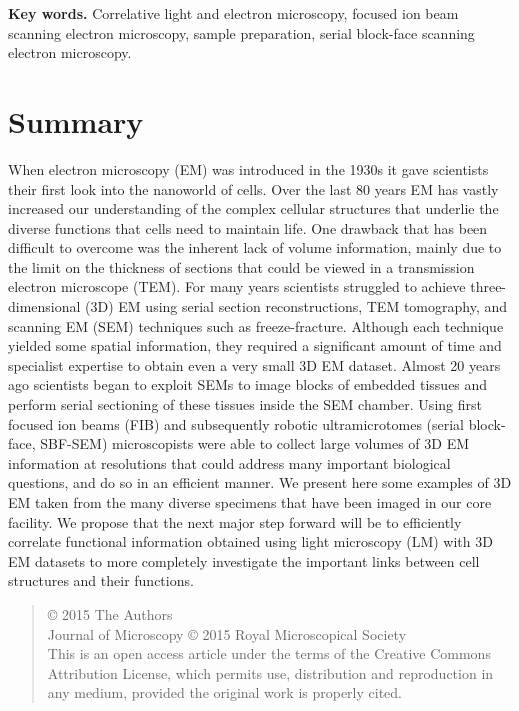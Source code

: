 \documentclass{article}
\begin{document}
\noindent\textbf{Key words.} Correlative light and electron microscopy, focused ion beam scanning electron microscopy, sample preparation, serial block-face scanning electron microscopy.

\section*{Summary}

When electron microscopy (EM) was introduced in the 1930s it gave scientists their first look into the nanoworld of cells. Over the last 80 years EM has vastly increased our understanding of the complex cellular structures that underlie the diverse functions that cells need to maintain life. One drawback that has been difficult to overcome was the inherent lack of volume information, mainly due to the limit on the thickness of sections that could be viewed in a transmission electron microscope (TEM). For many years scientists struggled to achieve three-dimensional (3D) EM using serial section reconstructions, TEM tomography, and scanning EM (SEM) techniques such as freeze-fracture. Although each technique yielded some spatial information, they required a significant amount of time and specialist expertise to obtain even a very small 3D EM dataset. Almost 20 years ago scientists began to exploit SEMs to image blocks of embedded tissues and perform serial sectioning of these tissues inside the SEM chamber. Using first focused ion beams (FIB) and subsequently robotic ultramicrotomes (serial block-face, SBF-SEM) microscopists were able to collect large volumes of 3D EM information at resolutions that could address many important biological questions, and do so in an efficient manner. We present here some examples of 3D EM taken from the many diverse specimens that have been imaged in our core facility. We propose that the next major step forward will be to efficiently correlate functional information obtained using light microscopy (LM) with 3D EM datasets to more completely investigate the important links between cell structures and their functions.

\begin{quote}\small
\noindent © 2015 The Authors\\
Journal of Microscopy © 2015 Royal Microscopical Society\\
This is an open access article under the terms of the Creative Commons Attribution License, which permits use, distribution and reproduction in any medium, provided the original work is properly cited.
\end{quote}
\end{document}
